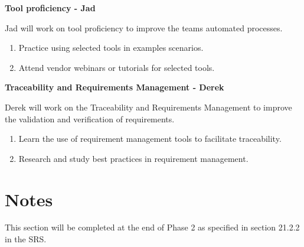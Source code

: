 \documentclass[12pt, titlepage]{article}
\begin{document}
\begin{enumerate}
          \textbf{Tool proficiency - Jad}

          Jad will work on tool proficiency to improve the teams automated processes.
          \begin{enumerate}
              \item Practice using selected tools in examples scenarios.
              \item Attend vendor webinars or tutorials for selected tools.
          \end{enumerate}

          \textbf{Traceability and Requirements Management - Derek}

          Derek will work on the Traceability and Requirements Management to improve the
          validation and verification of requirements.
          \begin{enumerate}
              \item Learn the use of requirement management tools to facilitate traceability.
              \item Research and study best practices in requirement management.
          \end{enumerate}

\end{enumerate}


\section*{Notes}
This section will be completed at the end of Phase 2 as specified in section 21.2.2 in the SRS.
\end{document}

